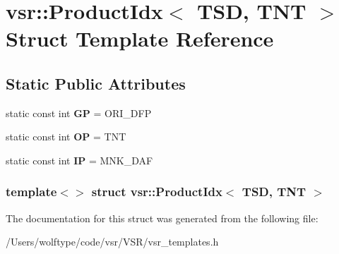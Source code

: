 \hypertarget{structvsr_1_1_product_idx_3_01_t_s_d_00_01_t_n_t_01_4}{\section{vsr\-:\-:Product\-Idx$<$ T\-S\-D, T\-N\-T $>$ Struct Template Reference}
\label{structvsr_1_1_product_idx_3_01_t_s_d_00_01_t_n_t_01_4}
}
\subsection*{Static Public Attributes}
\begin{DoxyCompactItemize}
\item 
\hypertarget{structvsr_1_1_product_idx_3_01_t_s_d_00_01_t_n_t_01_4_afa3c17ff93ddec2dcd1b48d615422af2}{static const int {\bfseries G\-P} = O\-R\-I\-\_\-\-D\-F\-P}\label{structvsr_1_1_product_idx_3_01_t_s_d_00_01_t_n_t_01_4_afa3c17ff93ddec2dcd1b48d615422af2}

\item 
\hypertarget{structvsr_1_1_product_idx_3_01_t_s_d_00_01_t_n_t_01_4_a1e4b8953b443f39105a0caf92aeeee9e}{static const int {\bfseries O\-P} = T\-N\-T}\label{structvsr_1_1_product_idx_3_01_t_s_d_00_01_t_n_t_01_4_a1e4b8953b443f39105a0caf92aeeee9e}

\item 
\hypertarget{structvsr_1_1_product_idx_3_01_t_s_d_00_01_t_n_t_01_4_a9c9b9b60ad4dc6d2b4a5d66d0e7b2cfe}{static const int {\bfseries I\-P} = M\-N\-K\-\_\-\-D\-A\-F}\label{structvsr_1_1_product_idx_3_01_t_s_d_00_01_t_n_t_01_4_a9c9b9b60ad4dc6d2b4a5d66d0e7b2cfe}

\end{DoxyCompactItemize}
\subsubsection*{template$<$$>$ struct vsr\-::\-Product\-Idx$<$ T\-S\-D, T\-N\-T $>$}



The documentation for this struct was generated from the following file\-:\begin{DoxyCompactItemize}
\item 
/\-Users/wolftype/code/vsr/\-V\-S\-R/vsr\-\_\-templates.\-h\end{DoxyCompactItemize}
